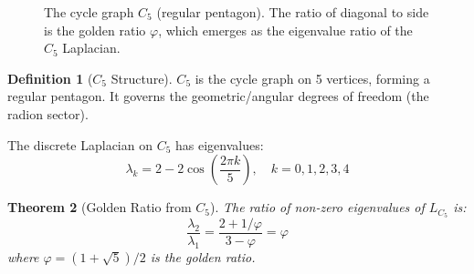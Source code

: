 \documentclass[11pt,a4paper]{article}
\newtheorem{theorem}{Theorem}[section]
\theoremstyle{definition}
\newtheorem{definition}[theorem]{Definition}
\begin{document}
\begin{figure}[h]
\centering
{}
\caption{The cycle graph $C_5$ (regular pentagon). The ratio of diagonal to side is the golden ratio $\varphi$, which emerges as the eigenvalue ratio of the $C_5$ Laplacian.}
\label{fig:C5}
\end{figure}

\begin{definition}[$C_5$ Structure]
$C_5$ is the cycle graph on 5 vertices, forming a regular pentagon. It governs the geometric/angular degrees of freedom (the radion sector).
\end{definition}

The discrete Laplacian on $C_5$ has eigenvalues:
\begin{equation}
\lambda_k = 2 - 2\cos\left(\frac{2\pi k}{5}\right), \quad k = 0,1,2,3,4
\end{equation}

\begin{theorem}[Golden Ratio from $C_5$]
The ratio of non-zero eigenvalues of $L_{C_5}$ is:
\begin{equation}
\frac{\lambda_2}{\lambda_1} = \frac{2 + 1/\varphi}{3 - \varphi} = \varphi
\end{equation}
where $\varphi = (1+\sqrt{5})/2$ is the golden ratio.
\end{theorem}
\end{document}
